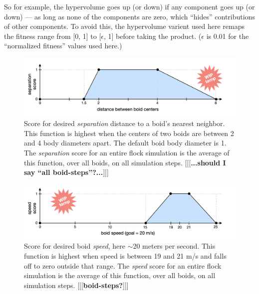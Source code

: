 \documentclass[letterpaper]{article}
\begin{document}
So for example, the hypervolume goes up (or down) if any component goes up (or down) --- as long as none of the components are zero, which ``hides'' contributions of other components. To avoid this, the hypervolume varient used here remaps the fitness range from [0, 1] to [$\epsilon$, 1] before taking the product. ($\epsilon$ is 0.01 for the ``normalized fitness'' values used here.)


\begin{figure}[t]
    \centering
    \includegraphics[width=0.9\linewidth]{images/temp_sep_score.png}
    \caption{Score for desired \textit{separation} distance to a boid's nearest neighbor. This function is highest when the centers of two boids are between 2 and 4 body diameters apart. The default boid body diameter is 1. The \textit{separation} score for an entire flock simulation is the average of this function, over all boids, on all simulation steps. [[[\textbf{...should I say ``all boid-steps''?...}]]]}
    \label{fig:SeparationScore}
\end{figure}


\begin{figure}[t]
    \centering
    \includegraphics[width=0.9\linewidth]{images/temp_speed_score.png}
    \caption{Score for desired boid \textit{speed}, here $\sim$20 meters per second. This function is highest when speed is between 19 and 21 m/s and falls off to zero outside that range. The \textit{speed} score for an entire flock simulation is the average of this function, over all boids, on all simulation steps. [[[\textbf{boid-steps?}]]]}
    \label{fig:speed_score}
\end{figure}
\end{document}
